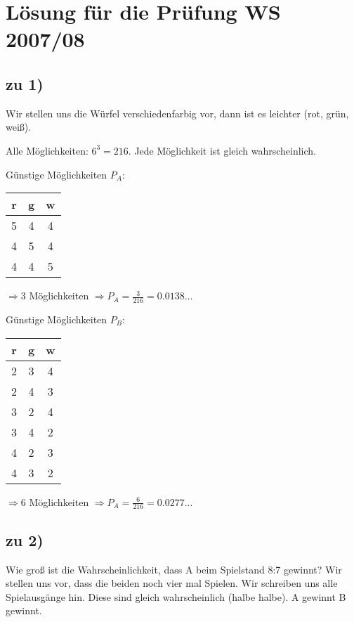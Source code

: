 \renewcommand{\ldate}{2016-01-12}
% 

\section{Lösung für die Prüfung WS 2007/08}

\subsection{zu 1)}
Wir stellen uns die Würfel verschiedenfarbig vor, dann ist es leichter (rot, grün, weiß). 

Alle Möglichkeiten: $ 6^3 = 216 $. Jede Möglichkeit ist gleich wahrscheinlich.

Günstige Möglichkeiten $P_A$: 

\begin{tabular}{|c|c|c|}
\hline r & g & w \\ 
\hline 5 & 4 & 4 \\ 
\hline 4 & 5 & 4 \\ 
\hline 4 & 4 & 5 \\ 
\hline 
\end{tabular}  
$\Rightarrow 3$ Möglichkeiten
$\Rightarrow P_A = \frac{3}{216} = 0.0138...$

Günstige Möglichkeiten $P_B$: 

\begin{tabular}{|c|c|c|}
\hline r & g & w \\ 
\hline 2 & 3 & 4 \\ 
\hline 2 & 4 & 3 \\ 
\hline 3 & 2 & 4 \\ 
\hline 3 & 4 & 2 \\ 
\hline 4 & 2 & 3 \\ 
\hline 4 & 3 & 2 \\ 
\hline 
\end{tabular}  
$\Rightarrow 6$ Möglichkeiten
$\Rightarrow P_A = \frac{6}{216} = 0.0277...$

\subsection{zu 2)}
Wie groß ist die Wahrscheinlichkeit, dass A beim Spielstand 8:7 gewinnt? Wir stellen uns vor, dass die beiden noch vier mal Spielen. Wir schreiben uns alle Spielausgänge hin. Diese sind gleich wahrscheinlich (halbe halbe). \color{red} A gewinnt \color{blue} B gewinnt. 

